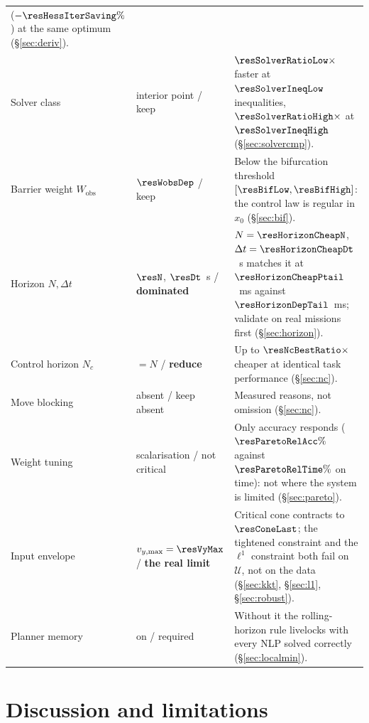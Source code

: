 \documentclass[11pt,a4paper]{article}
\newcommand{\Wobs}{W_{\mathrm{obs}}}
\newcommand{\Ninput}{N_c}
\begin{document}
\begin{table}[htbp]
\begin{tabular}{p{}p{}p{}}
      ($-\resHessIterSaving\%$) at the same optimum (\S\ref{sec:deriv}). \\
    Solver class & interior point / keep & $\resSolverRatioLow\times$ faster at $\resSolverIneqLow$
      inequalities, $\resSolverRatioHigh\times$ at $\resSolverIneqHigh$ (\S\ref{sec:solvercmp}). \\
    Barrier weight $\Wobs$ & $\resWobsDep$ / keep & Below the bifurcation threshold
      $[\resBifLow,\resBifHigh]$: the control law is regular in $x_0$ (\S\ref{sec:bif}). \\
    Horizon $N,\Delta t$ & $\resN$, $\resDt$~s / \textbf{dominated} & $N=\resHorizonCheapN$,
      $\Delta t=\resHorizonCheapDt$~s matches it at $\resHorizonCheapPtail$~ms against
      $\resHorizonDepTail$~ms; validate on real missions first (\S\ref{sec:horizon}). \\
    Control horizon $\Ninput$ & $=N$ / \textbf{reduce} & Up to $\resNcBestRatio\times$ cheaper at identical
      task performance (\S\ref{sec:nc}). \\
    Move blocking & absent / keep absent & Measured reasons, not omission (\S\ref{sec:nc}). \\
    Weight tuning & scalarisation / not critical & Only accuracy responds ($\resParetoRelAcc\%$ against
      $\resParetoRelTime\%$ on time): not where the system is limited (\S\ref{sec:pareto}). \\
    Input envelope & $v_{y,\max}=\resVyMax$ / \textbf{the real limit} & Critical cone contracts to
      $\resConeLast$; the tightened constraint and the $\ell^1$ constraint both fail on $\mathcal{U}$, not on
      the data (\S\ref{sec:kkt}, \S\ref{sec:l1}, \S\ref{sec:robust}). \\
    Planner memory & on / required & Without it the rolling-horizon rule livelocks with every NLP solved
      correctly (\S\ref{sec:localmin}). \\
    \bottomrule
  \end{tabular}
\end{table}

\section{Discussion and limitations}
\label{sec:discussion}
\end{document}
